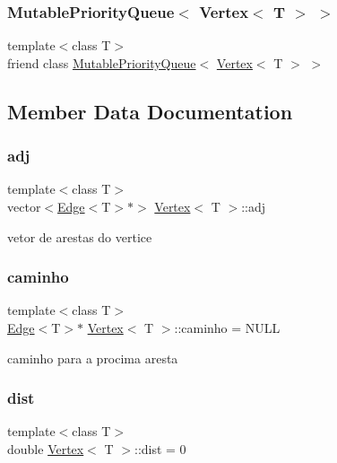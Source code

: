 \subsubsection{\texorpdfstring{Mutable\+Priority\+Queue$<$ Vertex$<$ T $>$ $>$}{MutablePriorityQueue< Vertex< T > >}}
{\footnotesize\ttfamily template$<$class T$>$ \\
friend class \mbox{\hyperlink{class_mutable_priority_queue}{Mutable\+Priority\+Queue}}$<$ \mbox{\hyperlink{class_vertex}{Vertex}}$<$ T $>$ $>$\hspace{0.3cm}{\ttfamily [friend]}}



\subsection{Member Data Documentation}
\mbox{\label{class_vertex_a3a5e3cdc85b3d338a5661cb5b55de729}} 
\subsubsection{\texorpdfstring{adj}{adj}}
{\footnotesize\ttfamily template$<$class T$>$ \\
vector$<$\mbox{\hyperlink{class_edge}{Edge}}$<$T$>$$\ast$$>$ \mbox{\hyperlink{class_vertex}{Vertex}}$<$ T $>$\+::adj\hspace{0.3cm}{\ttfamily [private]}}

vetor de arestas do vertice \mbox{\label{class_vertex_adb879f0355fa2d27be89fe9286fdfd4a}} 
\subsubsection{\texorpdfstring{caminho}{caminho}}
{\footnotesize\ttfamily template$<$class T$>$ \\
\mbox{\hyperlink{class_edge}{Edge}}$<$T$>$$\ast$ \mbox{\hyperlink{class_vertex}{Vertex}}$<$ T $>$\+::caminho = N\+U\+LL\hspace{0.3cm}{\ttfamily [private]}}

caminho para a procima aresta \mbox{\label{class_vertex_a08a2b813e77f97aa8b6c1d252e5417f7}} 
\subsubsection{\texorpdfstring{dist}{dist}}
{\footnotesize\ttfamily template$<$class T$>$ \\
double \mbox{\hyperlink{class_vertex}{Vertex}}$<$ T $>$\+::dist = 0\hspace{0.3cm}{\ttfamily [private]}}

